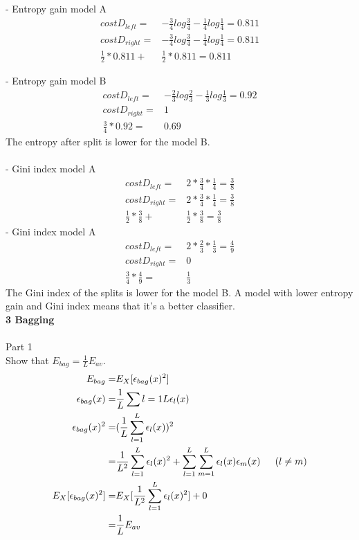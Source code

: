 \documentclass[12pt]{article}
\begin{document}
\indent - Entropy gain model A\\
	\begin{align*}
	cost{D_{left}} =& -\frac{3}{4} log \frac{3}{4} - \frac{1}{4} log \frac{1}{4} = 0.811\\
	cost{D_{right}} =& -\frac{3}{4} log \frac{3}{4} - \frac{1}{4} log \frac{1}{4} = 0.811\\
	\frac{1}{2} * 0.811 +& \frac{1}{2} * 0.811 = 0.811 
	\end{align*}

\indent - Entropy gain model B\\
	\begin{align*}
	cost{D_{left}} =& -\frac{2}{3} log \frac{2}{3} - \frac{1}{3} log \frac{1}{3} = 0.92\\
	cost{D_{right}} =& 1\\
	\frac{3}{4} * 0.92 =&  0.69 
	\end{align*}
\indent The entropy after split is lower for the model B.\\
\\
\indent - Gini index model A\\
	\begin{align*}
	cost{D_{left}} =& 2 * \frac{3}{4} * \frac{1}{4}  = \frac{3}{8}\\
	cost{D_{right}} =& 2 * \frac{3}{4} * \frac{1}{4}  = \frac{3}{8}\\
	\frac{1}{2} *  \frac{3}{8}+& \frac{1}{2} * \frac{3}{8} = \frac{3}{8}
	\end{align*}	
\indent - Gini index model A\\
	\begin{align*}
	cost{D_{left}} =& 2 * \frac{2}{3} * \frac{1}{3}  = \frac{4}{9}\\
	cost{D_{right}} =& 0\\
	\frac{3}{4} * \frac{4}{9} =& \frac{1}{3}
	\end{align*}	
\indent The Gini index of the splits is lower for the model B. A model with lower entropy gain and Gini index means that it's a better classifier.\\	
	
\noindent \textbf{3 Bagging} \\
\\
\noindent Part 1\\
\indent Show that $E_{bag} = \frac{1}{L} E_{av}$.
	\begin{align*}
	E_{bag} =& E_{X}[\epsilon_{bag}(x)^2]\\
	\epsilon_{bag}(x) =& \frac{1}{L} \sum{l=1}{L} \epsilon_{l}(x)\\
	\epsilon_{bag}(x)^2 =& (\frac{1}{L} \sum_{l=1}^{L} \epsilon_{l}(x))^2\\
	=& \frac{1}{L^2} \sum_{l=1}^{L} \epsilon_{l}(x)^2 + \sum_{l=1}^{L} \sum_{m=1}^{L} \epsilon_{l}(x) \epsilon_{m}(x) \indent (l \neq m)\\	
	E_{X}[\epsilon_{bag}(x)^2] =& E_{X}[\frac{1}{L^2} \sum_{l=1}^{L} \epsilon_{l}(x)^2] + 0 \\
	=& \frac{1}{L} E_{av}
	\end{align*}
	
\end{document}
